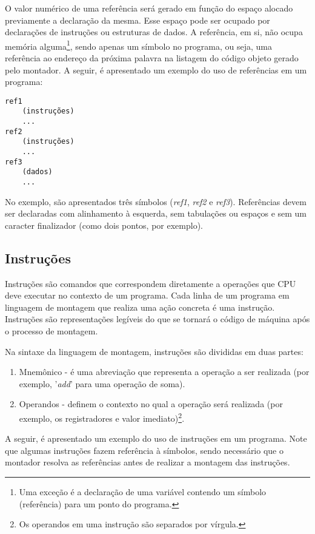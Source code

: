 \documentclass[11pt,a4paper]{report}
\begin{document}
O valor numérico de uma referência será gerado em função do espaço alocado
previamente a declaração da mesma. Esse espaço pode ser ocupado por
declarações de instruções ou estruturas de dados. A referência, em si,
não ocupa memória alguma\footnote{Uma exceção é a declaração de uma
variável contendo um símbolo (referência) para um ponto do programa.},
sendo apenas um símbolo no programa, ou seja, uma referência ao endereço
da próxima palavra na listagem do código objeto gerado pelo montador.
A seguir, é apresentado um exemplo do uso de referências em um programa:

\begin{verbatim}
ref1
    (instruções)
    ...
ref2
    (instruções)
    ...
ref3
    (dados)
    ...
\end{verbatim}

No exemplo, são apresentados três símbolos (\textit{ref1}, \textit{ref2}
e \textit{ref3}). Referências devem ser declaradas com alinhamento à 
esquerda, sem tabulações ou espaços e sem um caracter finalizador (como
dois pontos, por exemplo).

\subsection{Instruções}

Instruções são comandos que correspondem diretamente a operações que
CPU deve executar no contexto de um programa. Cada linha de um programa
em linguagem de montagem que realiza uma ação concreta é uma instrução.
Instruções são representações legíveis do que se tornará o código de
máquina após o processo de montagem.

Na sintaxe da linguagem de montagem, instruções são divididas em duas
partes:

\begin{enumerate}
\item Mnemônico - é uma abreviação que representa a operação a ser
realizada (por exemplo, '\textit{add}' para uma operação de soma).
\item Operandos - definem o contexto no qual a operação será realizada
(por exemplo, os registradores e valor imediato)\footnote{Os operandos
em uma instrução são separados por vírgula.}.
\end{enumerate}

A seguir, é apresentado um exemplo do uso de instruções em um programa.
Note que algumas instruções fazem referência à símbolos, sendo necessário
que o montador resolva as referências antes de realizar a montagem das
instruções.
\end{document}

